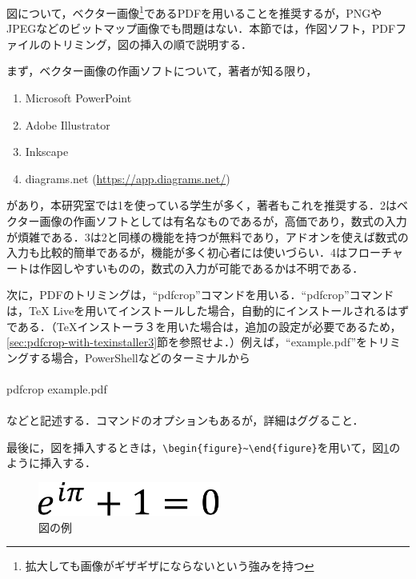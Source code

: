 \documentclass[11pt,a4paper]{jsarticle}
\begin{document}
図について，ベクター画像\footnote{拡大しても画像がギザギザにならないという強みを持つ}であるPDFを用いることを推奨するが，PNGやJPEGなどのビットマップ画像でも問題はない．本節では，作図ソフト，PDFファイルのトリミング，図の挿入の順で説明する．

まず，ベクター画像の作画ソフトについて，著者が知る限り，
\begin{enumerate} %
  \item Microsoft PowerPoint
  \item Adobe Illustrator
  \item Inkscape
  \item diagrams.net (\url{https://app.diagrams.net/})
\end{enumerate}
があり，本研究室では1を使っている学生が多く，著者もこれを推奨する．2はベクター画像の作画ソフトとしては有名なものであるが，高価であり，数式の入力が煩雑である．3は2と同様の機能を持つが無料であり，アドオンを使えば数式の入力も比較的簡単であるが，機能が多く初心者には使いづらい．4はフローチャートは作図しやすいものの，数式の入力が可能であるかは不明である．

次に，PDFのトリミングは，``pdfcrop''コマンドを用いる．``pdfcrop''コマンドは，TeX Liveを用いてインストールした場合，自動的にインストールされるはずである．（TeXインストーラ３を用いた場合は，追加の設定が必要であるため，\ref{sec:pdfcrop-with-texinstaller3}節を参照せよ．）例えば，``example.pdf''をトリミングする場合，PowerShellなどのターミナルから
\\\hrulefill\\
pdfcrop example.pdf\\
\hrulefill\\
などと記述する．コマンドのオプションもあるが，詳細はググること．

最後に，図を挿入するときは，\verb|\begin{figure}~\end{figure}|を用いて，図\ref{fig:example-image}のように挿入する．

\begin{figure}[hbtp]
  \centering %
  \includegraphics[width=6cm]{example-crop.pdf} %
  \caption{図の例} %
  \label{fig:example-image} %
\end{figure}
\end{document}
